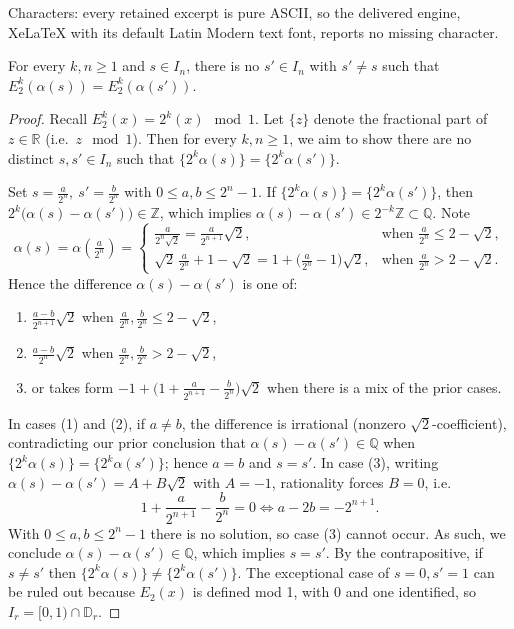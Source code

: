 \documentclass[10pt,a4paper]{amsart}
\newcommand{\DD}{\mathbb{D}}
\newcommand{\QQ}{\mathbb{Q}}
\newcommand{\RR}{\mathbb{R}}
\newcommand{\ZZ}{\mathbb{Z}}
\begin{document}
Characters: every retained excerpt is pure ASCII, so the delivered engine, XeLaTeX with its default Latin Modern text font, reports no missing character.
\begin{lemma}\label{lem:smallPreimage}
For every $k, n \geq 1$ and $s \in I_{n}$, there is no $s' \in I_n$ with $s'\neq s$ such that $E_2^k(\alpha(s))=E_2^k(\alpha(s'))$.
\end{lemma}

\begin{proof}
Recall $E_2^k(x) = 2^k(x) \mod 1$.
Let $\{z\}$ denote the fractional part of $z \in \RR$ (i.e.\ $z \mod 1$). Then for every $k, n \geq 1$, we aim to show there are no distinct $s, s' \in I_n$ such that $\{2^k\alpha(s)\} = \{2^k\alpha(s')\}$.

Set $s=\frac{a}{2^{n}},\ s'=\frac{b}{2^{n}}$ with $0\le a,b\le 2^{n}-1$.
If $\{2^{k}\alpha(s)\}=\{2^{k}\alpha(s')\}$, then $2^{k}\big(\alpha(s)-\alpha(s')\big)\in\ZZ$, which implies $\alpha(s)-\alpha(s')\in 2^{-k}\ZZ \subset\QQ$.
Note
\[
\alpha(s) = \alpha\left(\tfrac{a}{2^{n}}\right)=
\begin{cases}
\frac{a}{2^{n}\sqrt2}=\frac{a}{2^{n+1}}\sqrt2, & \text{when }\frac{a}{2^{n}}\le 2-\sqrt2,\\
\sqrt2\,\frac{a}{2^{n}}+1-\sqrt2
=1+\Big(\frac{a}{2^{n}}-1\Big)\sqrt2, & \text{when }\tfrac{a}{2^{n}}> 2-\sqrt2.
\end{cases}
\]
Hence the difference $\alpha(s)-\alpha(s')$ is one of: 
\begin{enumerate}
\item $\frac{a-b}{2^{n+1}}\sqrt{2}$ when $\frac{a}{2^{n}},\frac{b}{2^{n}}\le 2-\sqrt2$, 
\item $\frac{a-b}{2^{n}}\sqrt2$ when $\frac{a}{2^{n}},\frac{b}{2^{n}}> 2-\sqrt2$,
\item or takes form $-1+\Big(1+\frac{a}{2^{n+1}}-\frac{b}{2^{n}}\Big)\sqrt2$ when there is a mix of the prior cases.
\end{enumerate}
In cases (1) and (2), if $a\ne b$, the difference is irrational (nonzero $\sqrt2$-coefficient), contradicting our prior conclusion that $\alpha(s)-\alpha(s')\in \QQ$ when $\{2^{k}\alpha(s)\}=\{2^{k}\alpha(s')\}$; hence $a=b$ and $s=s'$.
In case (3), writing $\alpha(s)-\alpha(s')=A+B\sqrt2$ with $A=-1$, rationality forces $B=0$, i.e.
\[
1+\frac{a}{2^{n+1}}-\frac{b}{2^{n}}=0 \iff a-2b=-2^{n+1}.
\]
With $0\le a,b\le 2^{n}-1$ there is no solution, so case (3) cannot occur.
As such, we conclude $\alpha(s)-\alpha(s')\in\mathbb Q$, which implies $s=s'$. By the contrapositive, if $s\ne s'$ then $\{2^{k}\alpha(s)\}\ne \{2^{k}\alpha(s')\}$.
The exceptional case of $s=0,s'=1$ can be ruled out because $E_2(x)$ is defined mod 1, with $0$ and one identified, so $I_r = [0,1)\cap \DD_r$.
\end{proof}
\end{document}
